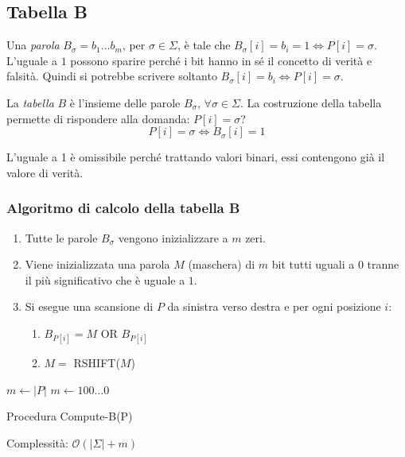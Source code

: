 \subsection{Tabella B}
Una \textit{parola} $B_{\sigma} = b_1 \dots b_m$, per $\sigma \in \Sigma$, è tale che $B_{\sigma}[i] = b_i = 1 \iff P[i] = \sigma$. \\ L’uguale a $1$ possono sparire perché i bit hanno in sé il concetto di verità e falsità. Quindi si potrebbe scrivere soltanto $B_{\sigma}[i] = b_i \iff P[i] = \sigma$.

La \textit{tabella} $B$ è l'insieme delle parole $B_\sigma$, $\forall \sigma \in \Sigma$. La costruzione della tabella permette di rispondere alla domanda: $P[i] = \sigma$?
\[P[i] = \sigma \iff B_{\sigma}[i] =1\]

L’uguale a 1 è omissibile perché trattando valori binari, essi contengono già il valore di verità.

\subsubsection{Algoritmo di calcolo della tabella B}
\begin{enumerate}
    \item Tutte le parole $B_\sigma$ vengono inizializzare a $m$ zeri.
    \item Viene inizializzata una parola $M$ (maschera) di $m$ bit tutti uguali a $0$ tranne il più significativo che è uguale a $1$. 
    \item Si esegue una scansione di $P$ da sinistra verso destra e per ogni posizione $i$: 
    \begin{enumerate}
        \item $B_{P[i]} = M$ OR $B_{P[i]}$
        \item $M = $ RSHIFT($M$)
    \end{enumerate}
\end{enumerate}

\begin{algorithm}[H]
\SetAlgoLined
{}
    $ m \leftarrow |P|$\;
    $m \leftarrow 100\dots0$\;
 \caption{Procedura Compute-B(P)}
\end{algorithm}


Complessità: $\mathcal{O}(|\Sigma|+m)$

